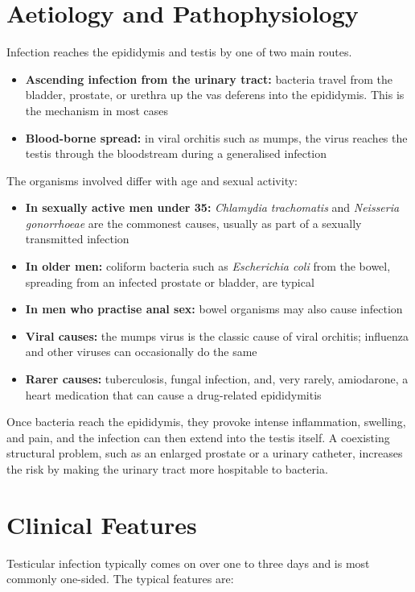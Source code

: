 \section*{Aetiology and Pathophysiology}
Infection reaches the epididymis and testis by one of two main routes.

\begin{itemize}
    \item \textbf{Ascending infection from the urinary tract:} bacteria travel from the bladder, prostate, or urethra up the vas deferens into the epididymis. This is the mechanism in most cases
    \item \textbf{Blood-borne spread:} in viral orchitis such as mumps, the virus reaches the testis through the bloodstream during a generalised infection
\end{itemize}

The organisms involved differ with age and sexual activity:
\begin{itemize}
    \item \textbf{In sexually active men under 35:} \textit{Chlamydia trachomatis} and \textit{Neisseria gonorrhoeae} are the commonest causes, usually as part of a sexually transmitted infection
    \item \textbf{In older men:} coliform bacteria such as \textit{Escherichia coli} from the bowel, spreading from an infected prostate or bladder, are typical
    \item \textbf{In men who practise anal sex:} bowel organisms may also cause infection
    \item \textbf{Viral causes:} the mumps virus is the classic cause of viral orchitis; influenza and other viruses can occasionally do the same
    \item \textbf{Rarer causes:} tuberculosis, fungal infection, and, very rarely, amiodarone, a heart medication that can cause a drug-related epididymitis
\end{itemize}

Once bacteria reach the epididymis, they provoke intense inflammation, swelling, and pain, and the infection can then extend into the testis itself. A coexisting structural problem, such as an enlarged prostate or a urinary catheter, increases the risk by making the urinary tract more hospitable to bacteria.

\section*{Clinical Features}
Testicular infection typically comes on over one to three days and is most commonly one-sided. The typical features are:

